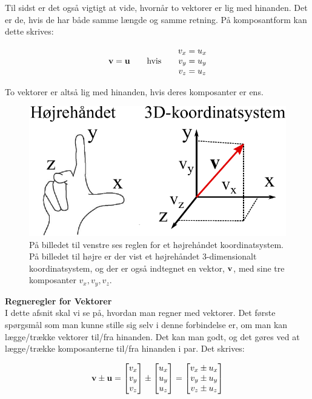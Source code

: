 Til sidst er det også vigtigt at vide, hvornår to vektorer er lig med hinanden. Det er de, hvis de har både samme længde og samme retning. På komposantform kan dette skrives:

\begin{equation}
\mathbf{v} = \mathbf{u} \quad \quad \text{hvis} \quad \quad
\begin{matrix}
v_x = u_x \\
v_y = u_y \\
v_z = u_z \\
\end{matrix}
\end{equation}

\vspace{2mm}

To vektorer er altså lig med hinanden, hvis deres komposanter er ens.\\

\begin{figure}[h!]
	\centering
	\includegraphics[scale=0.9]{matematik/fig/koordsys}
	\caption{På billedet til venstre ses reglen for et højrehåndet koordinatsystem. På billedet til højre er der vist et højrehåndet 3-dimensionalt koordinatsystem, og der er også indtegnet en vektor, $\mathbf{v}$, med sine tre komposanter $v_x,  v_y,  v_z$.}
	\label{koordsys}
\end{figure}

\noindent
\textbf{Regneregler for Vektorer}\\

I dette afsnit skal vi se på, hvordan man regner med vektorer. Det første spørgsmål som man kunne stille sig selv i denne forbindelse er, om man kan lægge/trække vektorer til/fra hinanden. Det kan man godt, og det gøres ved at lægge/trække komposanterne til/fra hinanden i par. Det skrives:

\begin{equation}
\mathbf{v} \pm \mathbf{u} = \begin{bmatrix} v_x \\ v_y \\ v_z \end{bmatrix} \pm \begin{bmatrix} u_x \\ u_y \\ u_z \end{bmatrix} = \begin{bmatrix} v_x \pm u_x \\ v_y \pm u_y \\ v_z \pm u_z \end{bmatrix}
\end{equation}
\vspace{2mm}

